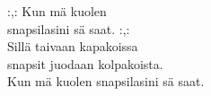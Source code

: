 
            :,: Kun mä kuolen \\
            snapsilasini sä saat. :,: \\
            Sillä taivaan kapakoissa \\
            snapsit juodaan kolpakoista. \\
            Kun mä kuolen snapsilasini sä saat. \\
